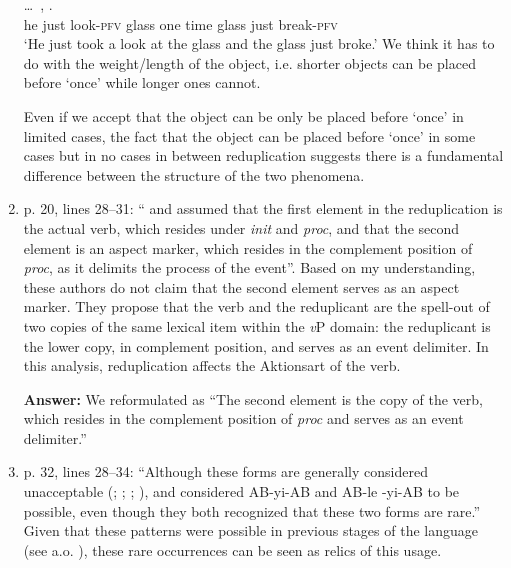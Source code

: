 \documentclass[fleqn,twoside]{article}
\begin{document}
\begin{enumerate}
\ex%
\gll {} \ldots\,     ,   .\\
he {} just look-\textsc{pfv} glass one time glass just break-\textsc{pfv}\\
\glt `He just took a look at the glass and the glass just broke.'
\z
We think it has to do with the weight/length of the object, i.e. shorter objects can be placed before    `once' while longer ones cannot.

Even if we accept that the object can be only be placed before    `once' in limited cases,
the fact that the object can be placed before    `once' in some cases but in no cases in between reduplication suggests there is a fundamental difference between the structure of the two phenomena.

\item
p. 20, lines 28--31: ``\citet{Arcodiaetal2014} and \citet{BascianoMelloni2017} assumed that the first
element in the reduplication is the actual verb, which resides under \textit{init} and \textit{proc}, and that the
second element is an aspect marker, which resides in the complement position of \textit{proc}, as it delimits
the process of the event''. Based on my understanding, these authors do not claim that the second
element serves as an aspect marker. They propose that the verb and the reduplicant are the spell-out
of two copies of the same lexical item within the \textit{v}P domain: the reduplicant is the lower copy, in
complement position, and serves as an event delimiter. In this analysis, reduplication affects the Aktionsart of the verb.

\noindent
\textbf{Answer:} We reformulated as ``The second element is the copy of the verb, which resides in the complement position of \textit{proc} and serves as an event delimiter.''

\item
p. 32, lines 28--34: ``Although these forms are generally considered unacceptable (\citealt[30]{LiThompson1981}; \citealt[275--276]{Hong1999}; \citealt[160]{BascianoMelloni2017}; \citealt[239]{YangWei2017}), \citet[269]{Fan1964} and \citet[143]{Sui2018} considered AB-yi-AB and AB-le -yi-AB to be possible, even though they both recognized that these two forms are rare.'' Given that these patterns were possible in previous stages of the language (see a.o. \citealt{BascianoMelloni2017}), these rare occurrences can be seen as relics of this usage.


\end{enumerate}
\end{document}

